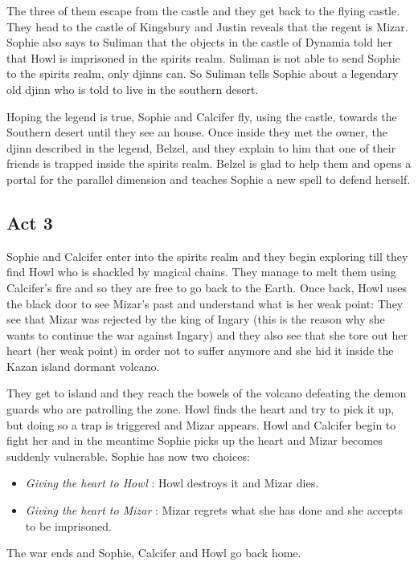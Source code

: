 The three of them escape from the castle and they get back to the flying castle. They head to the castle of Kingsbury and Justin reveals that the regent is Mizar. Sophie also says to Suliman that the objects in the castle of Dynamia told her that Howl is imprisoned in the spirits realm. Suliman is not able to send Sophie to the spirits realm, only djinns can. So Suliman tells Sophie about a legendary old djinn who is told to live in the southern desert.

Hoping the legend is true, Sophie and Calcifer fly, using the castle, towards the Southern desert until they see an house. Once inside they met the owner, the djinn described in the legend, Belzel, and they explain to him that one of their friends is trapped inside the spirits realm. Belzel is glad to help them and opens a portal for the parallel dimension and teaches Sophie a new spell to defend herself.

\subsection*{Act 3}

Sophie and Calcifer enter into the spirits realm and they begin exploring till they find Howl who is shackled by magical chains. They manage to melt them using Calcifer's fire and so they are free to go back to the Earth.
Once back, Howl uses the black door to see Mizar’s past and understand what is her weak point: They see that Mizar was rejected by the king of Ingary (this is the reason why she wants to continue the war against Ingary) and they also see that she tore out her heart (her weak point) in order not to suffer anymore and she hid it inside the Kazan island dormant volcano.

They get to island and they reach the bowels of the volcano defeating the demon guards who are patrolling the zone. Howl finds the heart and try to pick it up, but doing so a trap is triggered and Mizar appears. Howl and Calcifer begin to fight her and in the meantime Sophie picks up the heart and Mizar becomes suddenly vulnerable.
Sophie has now two choices:
\begin{itemize}
\item \textit{Giving the heart to Howl} : Howl destroys it and Mizar dies.
\item \textit{Giving the heart to Mizar} : Mizar regrets what she has done and she accepts to be imprisoned.
\end{itemize} 
The war ends and Sophie, Calcifer and Howl go back home.